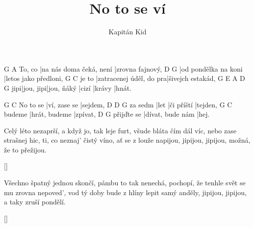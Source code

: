 \documentclass{song}
\title{No to se ví}
\author{Kapitán Kid}
\begin{document}
\strophe
       G                       A
To, co |na nás doma čeká, není |zrovna fajnový,
D                    G
|od pondělka na koni |letos jako předloni,
      G                       C
je to |zatracenej úděl, do pra|šivejch estakád,
    G         E\7        A\7   D\7    G
jipi|jou, jipi|jou, ňáký |cizí |krávy |hnát.
\endstrophe

         G            C
No to se |ví, zase se |sejdem,
        D    D\7        G
za sedm |let |či příští |tejden,
       G             C
budeme |hrát, budeme |zpívat,
           D\7              G
přijďte se |dívat, bude nám |hej.
\endstrophe

\strophe*
Celý léto nezaprší, a když jo, tak leje furt,
všude bláta čím dál víc, nebo zase strašnej hic,
ti, co neznaj' čistý víno, ať se z louže napijou,
jipijou, jipijou, možná, že to přežijou.
\endstrophe

\ref{}

\strophe*
Všechno špatný jednou skončí, pámbu to tak nenechá,
pochopí, že tenhle svět se mu zrovna nepoved',
vod tý doby bude z hlíny lepit samý anděly,
jipijou, jipijou, a taky zruší pondělí.
\endstrophe

\ref{}
\end{document}

